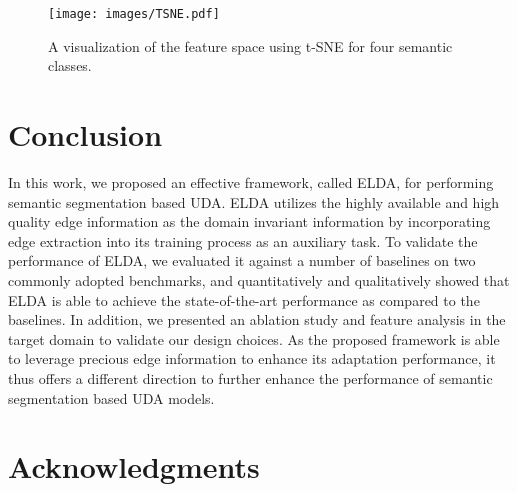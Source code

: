 \documentclass{bmvc2k}
\begin{document}
\begin{figure}[t]
  \centering
  \texttt{[image: images/TSNE.pdf]}
  \caption{
  A visualization of the feature space using t-SNE for four semantic classes.
}
  \label{fig:TSNE}
\end{figure}
 
\section{Conclusion}
\label{sec::conclusions}


In this work, we proposed an effective framework, called ELDA, for performing semantic segmentation based UDA. ELDA utilizes the highly available and high quality edge information as the domain invariant information by incorporating edge extraction into its training process as an auxiliary task.
To validate the performance of ELDA, we evaluated it against a number of baselines on two commonly adopted benchmarks, and quantitatively and qualitatively showed that ELDA is able to achieve the state-of-the-art performance as compared to the baselines. In addition, we presented an ablation study and feature analysis in the target domain to validate our design choices. As the proposed framework is able to leverage precious edge information to enhance its adaptation performance, it thus offers a different direction to further enhance the performance of semantic segmentation based UDA models.






%
 
\section{Acknowledgments}
\label{sec::acknowledgments}


 
 
\end{document}
